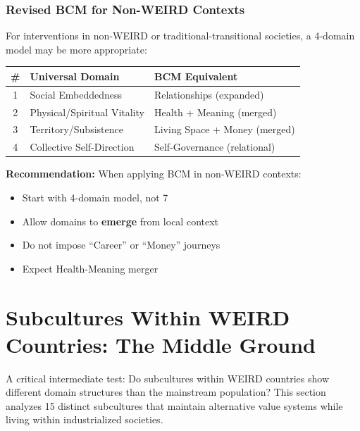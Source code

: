 \subsubsection{Revised BCM for Non-WEIRD Contexts}

For interventions in non-WEIRD or traditional-transitional societies, a 4-domain model may be more appropriate:

\begin{center}
\begin{tabular}{@{}clp{5cm}@{}}
\toprule
\textbf{\#} & \textbf{Universal Domain} & \textbf{BCM Equivalent} \\
\midrule
1 & Social Embeddedness & Relationships (expanded) \\
2 & Physical/Spiritual Vitality & Health + Meaning (merged) \\
3 & Territory/Subsistence & Living Space + Money (merged) \\
4 & Collective Self-Direction & Self-Governance (relational) \\
\bottomrule
\end{tabular}
\end{center}

\textbf{Recommendation:} When applying BCM in non-WEIRD contexts:
\begin{itemize}[nosep]
\item Start with 4-domain model, not 7
\item Allow domains to \textbf{emerge} from local context
\item Do not impose ``Career'' or ``Money'' journeys
\item Expect Health-Meaning merger
\end{itemize}


\section{Subcultures Within WEIRD Countries: The Middle Ground}
\label{sec:bj-subcultures}

A critical intermediate test: Do subcultures within WEIRD countries show different domain structures than the mainstream population? This section analyzes 15 distinct subcultures that maintain alternative value systems while living within industrialized societies.

